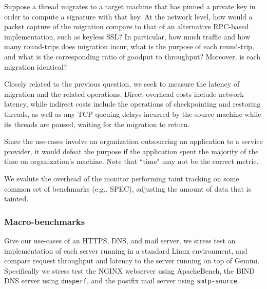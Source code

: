 %
Suppose a thread migrates to a target machine that has pinned a private key in
order to compute a signature with that key.
%
At the network level, how would a packet capture of the migration compare to
that of an alternative RPC-based implementation, such as keyless SSL\@?
%
In particular, how much traffic and how many round-trips does migration incur,
what is the purpose of each round-trip, and what is the corresponding ratio of
goodput to throughput?
%
Moreover, is each migration identical?


Closely related to the previous question, we seek to measure the latency of
migration and the related operations.
%
Direct overhead costs include network latency, while indirect costs include the
operations of checkpointing and restoring threads, as well as any TCP queuing
delays incurred by the source machine while its threads are paused, waiting for
the migration to return.


%
Since the use-cases involve an organization outsourcing an application to a
service provider, it would defeat the purpose if the application spent the
majority of the time on organization's machine.
%
Note that ``time" may not be the correct metric.



We evalute the overhead of the monitor performing taint tracking on some common
set of benchmarks (e.g., SPEC), adjusting the amount of data that is tainted.


\subsubsection{Macro-benchmarks}

%
Give our use-cases of an HTTPS, DNS, and mail server, we stress test an
implementation of each server running in a standard Linux environment, and
compare request throughput and latency to the server running on top of Gemini.
%
Specifically we stress test the NGINX webserver using ApacheBench, the BIND DNS
server using \texttt{dnsperf}, and the postfix mail server using
\texttt{smtp-source}.


